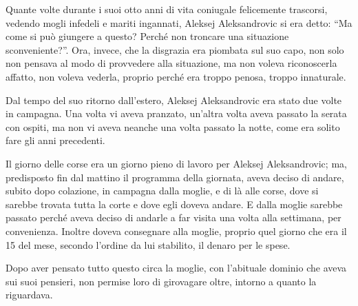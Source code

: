 Quante volte durante i suoi otto anni di vita coniugale felicemente trascorsi, vedendo mogli infedeli e mariti ingannati, Aleksej Aleksandrovic si era detto: ``Ma come si può giungere a questo? Perché non troncare una situazione sconveniente?''. Ora, invece, che la disgrazia era piombata sul suo capo, non solo non pensava al modo di provvedere alla situazione, ma non voleva riconoscerla affatto, non voleva vederla, proprio perché era troppo penosa, troppo innaturale. 

Dal tempo del suo ritorno dall'estero, Aleksej Aleksandrovic era stato due volte in campagna. Una volta vi aveva pranzato, un'altra volta aveva passato la serata con ospiti, ma non vi aveva neanche una volta passato la notte, come era solito fare gli anni precedenti. 

Il giorno delle corse era un giorno pieno di lavoro per Aleksej Aleksandrovic; ma, predisposto fin dal mattino il programma della giornata, aveva deciso di andare, subito dopo colazione, in campagna dalla moglie, e di là alle corse, dove si sarebbe trovata tutta la corte e dove egli doveva andare. E dalla moglie sarebbe passato perché aveva deciso di andarle a far visita una volta alla settimana, per convenienza. Inoltre doveva consegnare alla moglie, proprio quel giorno che era il 15 del mese, secondo l'ordine da lui stabilito, il denaro per le spese. 

Dopo aver pensato tutto questo circa la moglie, con l'abituale dominio che aveva sui suoi pensieri, non permise loro di girovagare oltre, intorno a quanto la riguardava. 

